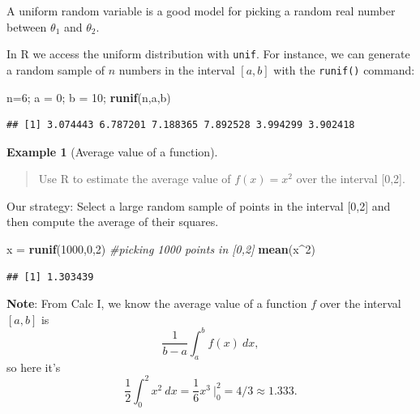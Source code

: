 \documentclass[
]{book}
\newenvironment{Shaded}{\begin{snugshade}}{\end{snugshade}}
\newcommand{\CommentTok}[1]{\textcolor[rgb]{0.56,0.35,0.01}{\textit{#1}}}
\newcommand{\DecValTok}[1]{\textcolor[rgb]{0.00,0.00,0.81}{#1}}
\newcommand{\FunctionTok}[1]{\textcolor[rgb]{0.13,0.29,0.53}{\textbf{#1}}}
\newcommand{\NormalTok}[1]{#1}
\newcommand{\OtherTok}[1]{\textcolor[rgb]{0.56,0.35,0.01}{#1}}
\newcommand{\SpecialCharTok}[1]{\textcolor[rgb]{0.81,0.36,0.00}{\textbf{#1}}}
\theoremstyle{definition}
\theoremstyle{definition}
\newtheorem{example}{Example}[chapter]
\theoremstyle{definition}
\theoremstyle{definition}
\theoremstyle{remark}
\begin{document}
A uniform random variable is a good model for picking a random real number between \(\theta_1\) and \(\theta_2\).

In R we access the uniform distribution with \texttt{unif}. For instance, we can generate a random sample of \(n\) numbers in the interval \([a,b]\) with the \texttt{runif()} command:

\begin{Shaded}
\begin{Highlighting}[]
\NormalTok{n}\OtherTok{=}\DecValTok{6}\NormalTok{; a }\OtherTok{=} \DecValTok{0}\NormalTok{; b }\OtherTok{=} \DecValTok{10}\NormalTok{;}
\FunctionTok{runif}\NormalTok{(n,a,b)}
\end{Highlighting}
\end{Shaded}

\begin{verbatim}
## [1] 3.074443 6.787201 7.188365 7.892528 3.994299 3.902418
\end{verbatim}

\begin{example}[Average value of a function]
\leavevmode

\begin{quote}
Use R to estimate the average value of \(f(x) = x^2\) over the interval {[}0,2{]}.
\end{quote}

Our strategy: Select a large random sample of points in the interval {[}0,2{]} and then compute the average of their squares.

\begin{Shaded}
\begin{Highlighting}[]
\NormalTok{x }\OtherTok{=} \FunctionTok{runif}\NormalTok{(}\DecValTok{1000}\NormalTok{,}\DecValTok{0}\NormalTok{,}\DecValTok{2}\NormalTok{) }\CommentTok{\#picking 1000 points in [0,2]}
\FunctionTok{mean}\NormalTok{(x}\SpecialCharTok{\^{}}\DecValTok{2}\NormalTok{)}
\end{Highlighting}
\end{Shaded}

\begin{verbatim}
## [1] 1.303439
\end{verbatim}

\textbf{Note}: From Calc I, we know the average value of a function \(f\) over the interval \([a,b]\) is \[\frac{1}{b-a} \int_a^b f(x)~dx,\]
so here it's \[\frac{1}{2}\int_0^2 x^2~dx = \frac{1}{6} x^3 ~\biggr|_0^2 = 4/3 \approx 1.333.\]

\end{example}
\end{document}
